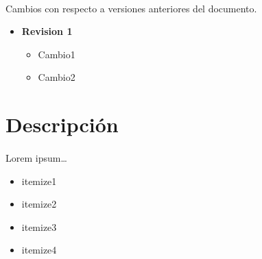 \documentclass[16pt,spanish]{article}
\title{\titlename}
\author{\authorname}
\def \plpath{.}
\begin{document}




\tableofcontents
\cleardoublepage


\paragraph{}
Cambios con respecto a versiones anteriores del documento.

\begin{itemize}
	\item {\bf Revision 1}
		\begin{itemize}
			\item Cambio1
			\item Cambio2
		\end{itemize}
\end{itemize}


\section{Descripción}
\label{sec:descripcion}

\paragraph{}
Lorem ipsum\ldots

\begin{itemize}
	\item itemize1
	\item itemize2
	\item itemize3
	\item itemize4
\end{itemize}
\end{document}
